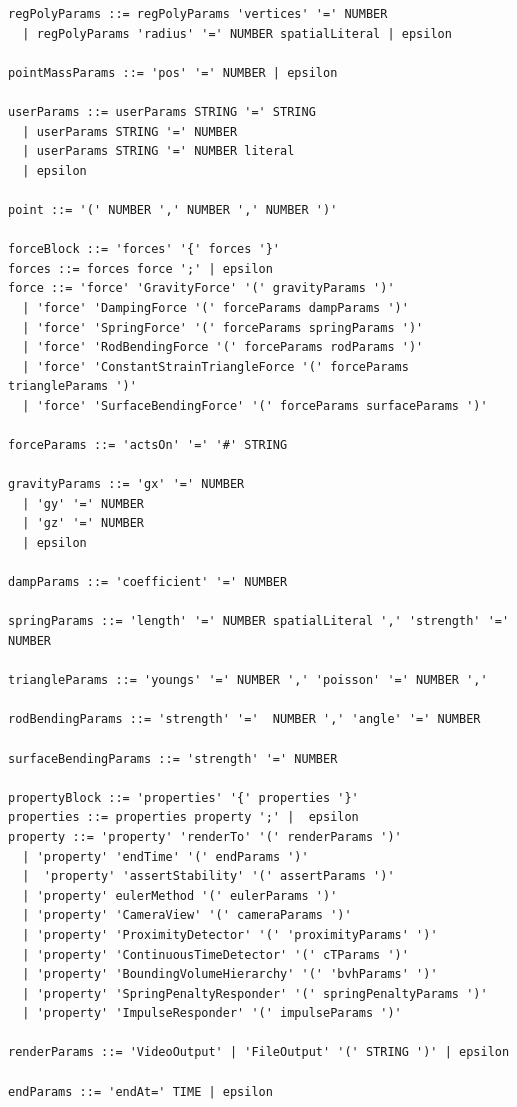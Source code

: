 \begin{verbatim}
regPolyParams ::= regPolyParams 'vertices' '=' NUMBER
  | regPolyParams 'radius' '=' NUMBER spatialLiteral | epsilon

pointMassParams ::= 'pos' '=' NUMBER | epsilon

userParams ::= userParams STRING '=' STRING 
  | userParams STRING '=' NUMBER 
  | userParams STRING '=' NUMBER literal
  | epsilon

point ::= '(' NUMBER ',' NUMBER ',' NUMBER ')'

forceBlock ::= 'forces' '{' forces '}'
forces ::= forces force ';' | epsilon
force ::= 'force' 'GravityForce' '(' gravityParams ')' 
  | 'force' 'DampingForce '(' forceParams dampParams ')' 
  | 'force' 'SpringForce' '(' forceParams springParams ')' 
  | 'force' 'RodBendingForce '(' forceParams rodParams ')' 
  | 'force' 'ConstantStrainTriangleForce '(' forceParams triangleParams ')' 
  | 'force' 'SurfaceBendingForce' '(' forceParams surfaceParams ')' 

forceParams ::= 'actsOn' '=' '#' STRING

gravityParams ::= 'gx' '=' NUMBER
  | 'gy' '=' NUMBER
  | 'gz' '=' NUMBER
  | epsilon

dampParams ::= 'coefficient' '=' NUMBER

springParams ::= 'length' '=' NUMBER spatialLiteral ',' 'strength' '=' NUMBER

triangleParams ::= 'youngs' '=' NUMBER ',' 'poisson' '=' NUMBER ','

rodBendingParams ::= 'strength' '='  NUMBER ',' 'angle' '=' NUMBER

surfaceBendingParams ::= 'strength' '=' NUMBER

propertyBlock ::= 'properties' '{' properties '}'
properties ::= properties property ';' |  epsilon
property ::= 'property' 'renderTo' '(' renderParams ')' 
  | 'property' 'endTime' '(' endParams ')' 
  |  'property' 'assertStability' '(' assertParams ')' 
  | 'property' eulerMethod '(' eulerParams ')' 
  | 'property' 'CameraView' '(' cameraParams ')' 
  | 'property' 'ProximityDetector' '(' 'proximityParams' ')' 
  | 'property' 'ContinuousTimeDetector' '(' cTParams ')'
  | 'property' 'BoundingVolumeHierarchy' '(' 'bvhParams' ')'
  | 'property' 'SpringPenaltyResponder' '(' springPenaltyParams ')'
  | 'property' 'ImpulseResponder' '(' impulseParams ')'

renderParams ::= 'VideoOutput' | 'FileOutput' '(' STRING ')' | epsilon

endParams ::= 'endAt=' TIME | epsilon 


\end{verbatim}
